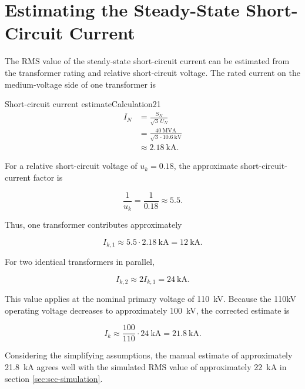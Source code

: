 \section{Estimating the Steady-State Short-Circuit Current}
\label{sec:section24}

The RMS value of the steady-state short-circuit current can be estimated from
the transformer rating and relative short-circuit voltage. The rated current
on the medium-voltage side of one transformer is

\begin{calculation}{Short-circuit current estimate}{Calculation21}
\begin{align}
I_{N}
  &= \frac{S_N}{\sqrt{3}\,U_N} \\
  &= \frac{\SI{40}{\mega\volt\ampere}}
          {\sqrt{3}\cdot\SI{10.6}{\kilo\volt}} \\
  &\approx \SI{2.18}{\kilo\ampere}.
\end{align}

For a relative short-circuit voltage of $u_k=0.18$, the approximate
short-circuit-current factor is

\begin{equation}
\frac{1}{u_k}=\frac{1}{0.18}\approx 5.5.
\end{equation}

Thus, one transformer contributes approximately

\begin{equation}
I_{k,1}\approx 5.5\cdot\SI{2.18}{\kilo\ampere}
          =\SI{12}{\kilo\ampere}.
\end{equation}

For two identical transformers in parallel,

\begin{equation}
I_{k,2}\approx 2I_{k,1}=\SI{24}{\kilo\ampere}.
\end{equation}

This value applies at the nominal primary voltage of \SI{110}{\kilo\volt}.
Because the 110kV operating voltage decreases to approximately
\SI{100}{\kilo\volt}, the corrected estimate is

\begin{equation}
I_k\approx \frac{100}{110}\cdot\SI{24}{\kilo\ampere}
    =\boxed{\SI{21.8}{\kilo\ampere}}.
\end{equation}
\end{calculation}

Considering the simplifying assumptions, the manual estimate of approximately
\SI{21.8}{\kilo\ampere} agrees well with the simulated RMS value of
approximately \SI{22}{\kilo\ampere} in section \ref{sec:scc-simulation}.

